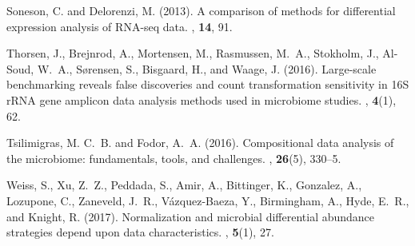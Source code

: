 \documentclass{bioinfo}
\begin{document}
\begin{thebibliography}{}
Soneson, C. and Delorenzi, M. (2013).
\newblock A comparison of methods for differential expression analysis of
  {RNA-seq} data.
, {\bf 14}, 91.

Thorsen, J., Brejnrod, A., Mortensen, M., Rasmussen, M.~A., Stokholm, J.,
  Al-Soud, W.~A., S{\o}rensen, S., Bisgaard, H., and Waage, J. (2016).
\newblock Large-scale benchmarking reveals false discoveries and count
  transformation sensitivity in 16{S} r{RNA} gene amplicon data analysis
  methods used in microbiome studies.
, {\bf 4}(1), 62.

Tsilimigras, M. C.~B. and Fodor, A.~A. (2016).
\newblock Compositional data analysis of the microbiome: fundamentals, tools,
  and challenges.
, {\bf 26}(5), 330--5.

Weiss, S., Xu, Z.~Z., Peddada, S., Amir, A., Bittinger, K., Gonzalez, A.,
  Lozupone, C., Zaneveld, J.~R., V{\'a}zquez-Baeza, Y., Birmingham, A., Hyde,
  E.~R., and Knight, R. (2017).
\newblock Normalization and microbial differential abundance strategies depend
  upon data characteristics.
, {\bf 5}(1), 27.

\end{thebibliography}
\end{document}
